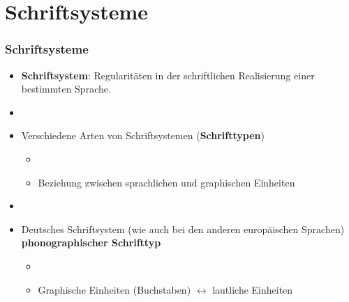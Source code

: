 \section{Schriftsysteme}


\begin{frame}
\frametitle{Schriftsysteme}

\begin{itemize}
	\item \textbf{Schriftsystem}: Regularitäten in der schriftlichen Realisierung einer bestimmten Sprache.
	\item[]
	\item Verschiedene Arten von Schriftsystemen (\textbf{Schrifttypen})
	
	\begin{itemize}
		\item[]
		\item Beziehung zwischen sprachlichen und graphischen Einheiten
	\end{itemize}
	
	\item[]
	\item Deutsches Schriftsystem (wie auch bei den anderen europäischen Sprachen) \ras \textbf{phonographischer Schrifttyp}
	
	\begin{itemize}
		\item[]
		\item Graphische Einheiten (Buchstaben) $\leftrightarrow$ lautliche Einheiten
	\end{itemize}
\end{itemize}


\end{frame}



